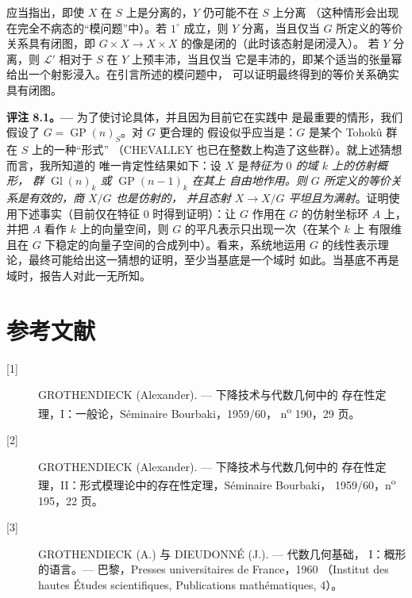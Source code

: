 应当指出，即使 $X$ 在 $S$ 上是分离的，$Y$ 仍可能不在 $S$ 上分离
（这种情形会出现在完全不病态的“模问题”中）。若 $1^\circ$ 成立，则
$Y$ 分离，当且仅当 $G$ 所定义的等价关系具有闭图，即
$G\times X\to X\times X$ 的像是闭的（此时该态射是闭浸入）。
若 $Y$ 分离，则 $\mathcal L'$ 相对于 $S$ 在 $Y$ 上预丰沛，当且仅当
它是丰沛的，即某个适当的张量幂给出一个射影浸入。在引言所述的模问题中，
可以证明最终得到的等价关系确实具有闭图。

\medskip
\noindent\textbf{评注 8.1。---} 为了使讨论具体，并且因为目前它在实践中
是最重要的情形，我们假设了 $G=\operatorname{GP}(n)_S$。对 $G$ 更合理的
假设似乎应当是：$G$ 是某个 Tohokû 群在 $S$ 上的一种“形式”
（CHEVALLEY 也已在整数上构造了这些群）。就上述猜想而言，我所知道的
唯一肯定性结果如下：设 $X$ 是\emph{特征为 $0$ 的域 $k$ 上的仿射概形，
群 $\operatorname{Gl}(n)_k$ 或 $\operatorname{GP}(n-1)_k$ 在其上
自由地作用。则 $G$ 所定义的等价关系是有效的，商 $X/G$ 也是仿射的，
并且态射 $X\to X/G$ 平坦且为满射}。证明使用下述事实（目前仅在特征
$0$ 时得到证明）：让 $G$ 作用在 $G$ 的仿射坐标环 $A$ 上，并把 $A$
看作 $k$ 上的向量空间，则 $G$ 的平凡表示只出现一次（在某个 $k$ 上
有限维且在 $G$ 下稳定的向量子空间的合成列中）。看来，系统地运用
$G$ 的线性表示理论，最终可能给出这一猜想的证明，至少当基底是一个域时
如此。当基底不再是域时，报告人对此一无所知。

\section*{参考文献}

\begin{description}
\item[{[1]}] GROTHENDIECK (Alexander). --- 下降技术与代数几何中的
存在性定理，I：一般论，Séminaire Bourbaki，1959/60，
n\textsuperscript{o} 190，29 页。

\item[{[2]}] GROTHENDIECK (Alexander). --- 下降技术与代数几何中的
存在性定理，II：形式模理论中的存在性定理，Séminaire Bourbaki，
1959/60，n\textsuperscript{o} 195，22 页。

\item[{[3]}] GROTHENDIECK (A.) 与 DIEUDONNÉ (J.). --- 代数几何基础，
I：概形的语言。--- 巴黎，Presses universitaires de France，1960
（Institut des hautes Études scientifiques, Publications
mathématiques, 4）。
\end{description}

\par
